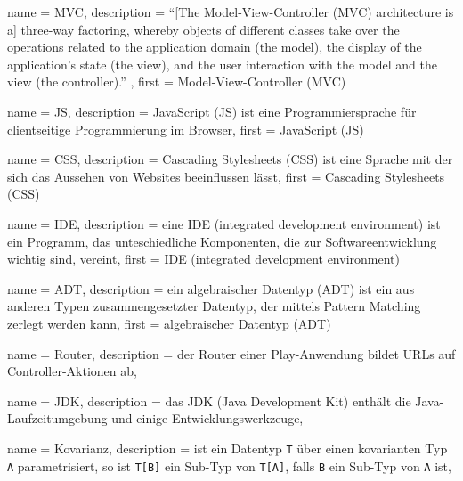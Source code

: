 






{
  name        = MVC,
  description = {"`[The Model-View-Controller (MVC) architecture is a] three-way factoring, whereby objects of different classes take over the operations related to the application domain (the model), the display of the application's state (the view), and the user interaction with the model and the view (the controller)."' \cite[vgl.][S.~1]{mvc}},
  first       = {Model-View-Controller (MVC)}
}


{
  name        = JS,
  description = {JavaScript (JS) ist eine Programmiersprache für clientseitige Programmierung im Browser},
  first       = {JavaScript (JS)}
}


{
  name        = CSS,
  description = {Cascading Stylesheets (CSS) ist eine Sprache mit der sich das Aussehen von Websites beeinflussen lässt},
  first       = {Cascading Stylesheets (CSS)}
}


{
  name        = IDE,
  description = {eine IDE (integrated development environment) ist ein Programm, das unteschiedliche Komponenten, die zur Softwareentwicklung wichtig sind, vereint},
  first       = {IDE (integrated development environment)}
}


{
  name        = ADT,
  description = {ein algebraischer Datentyp (ADT) ist ein aus anderen Typen zusammengesetzter Datentyp, der mittels Pattern Matching zerlegt werden kann},
  first       = {algebraischer Datentyp (ADT)}
}


{
  name        = Router,
  description = {der Router einer Play-Anwendung bildet URLs auf Controller-Aktionen ab},
}


{
  name        = JDK,
  description = {das JDK (Java Development Kit) enthält die Java-Laufzeitumgebung und einige Entwicklungswerkzeuge},
}


{
  name        = Kovarianz,
  description = {ist ein Datentyp \lstinline|T| über einen kovarianten Typ \lstinline|A| parametrisiert, so ist \lstinline|T[B]| ein Sub-Typ von \lstinline|T[A]|, falls \lstinline|B| ein Sub-Typ von \lstinline|A| ist},
}